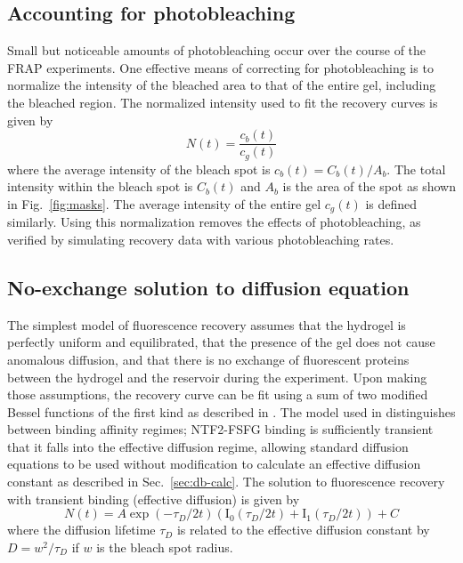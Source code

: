 \subsection{Accounting for photobleaching}
\label{sec:photobleaching}
Small but noticeable amounts of photobleaching occur over the course of the FRAP experiments.  One effective means of correcting for photobleaching is to normalize the intensity of the bleached area to that of the entire gel, including the bleached region.  The normalized intensity used to fit the recovery curves is given by
\begin{equation}
N(t) = \frac{c_b(t)}{c_g(t)}
\end{equation} where the average intensity of the bleach spot is $c_b(t) = C_b(t)/A_b$. The total intensity within the bleach spot is $C_b(t)$ and $A_b$ is the area of the spot as shown in Fig.~\ref{fig:masks}.  The average intensity of the entire gel $c_g(t)$ is defined similarly.  Using this normalization removes the effects of photobleaching, as verified by simulating recovery data with various photobleaching rates.

\subsection{No-exchange solution to diffusion equation}
\label{sec:no-exchange}

The simplest model of fluorescence recovery assumes that the hydrogel is perfectly uniform and equilibrated, that the presence of the gel does not cause anomalous diffusion, and that there is no exchange of fluorescent proteins between the hydrogel and the reservoir during the experiment.  Upon making those assumptions, the recovery curve can be fit using a sum of two modified Bessel functions of the first kind as described in \cite{yang18,sprague04}.  The model used in \cite{sprague04} distinguishes between binding affinity regimes; NTF2-FSFG binding is sufficiently transient that it falls into the effective diffusion regime, allowing standard diffusion equations to be used without modification to calculate an effective diffusion constant as described in Sec.~\ref{sec:db-calc}.  The solution to fluorescence recovery with transient binding (effective diffusion) is given by
\begin{equation}
N(t) = A\exp(-\tau_D/2t)\left(\mathrm{I}_0(\tau_D/2t)+\mathrm{I}_1(\tau_D/2t)\right)+C
\end{equation} where the diffusion lifetime $\tau_D$ is related to the effective diffusion constant by $D = w^2/\tau_D$ if $w$ is the bleach spot radius.  

